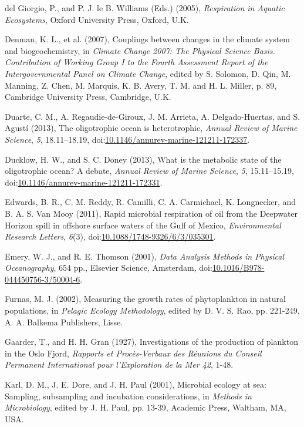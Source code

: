 \begin{singlespace}
{{del Giorgio, P., and P. J. le B. Williams (Eds.) (2005), \emph{Respiration in Aquatic Ecosystems}, Oxford University Press, Oxford, U.K.

Denman, K. L., et al. (2007), Couplings between changes in the climate system and biogeochemistry, in \emph{Climate Change 2007: The Physical Science Basis. Contribution of Working Group I to the Fourth Assessment Report of the Intergovernmental Panel on Climate Change}, edited by S. Solomon, D. Qin, M. Manning, Z. Chen, M. Marquis, K. B. Avery, T. M. and H. L. Miller, p. 89, Cambridge University Press, Cambridge, U.K.

Duarte, C. M., A. Regaudie-de-Giroux, J. M. Arrieta, A. Delgado-Huertas, and S. Agust\'{i} (2013), The oligotrophic ocean is heterotrophic, \emph{Annual Review of Marine Science}, \emph{5}, 18.11--18.19, doi:\href{http://dx.doi.org/10.1146/annurev-marine-121211-172337}{10.1146/annurev-marine-121211-172337}.

Ducklow, H. W., and S. C. Doney (2013), What is the metabolic state of the oligotrophic ocean? A debate, \emph{Annual Review of Marine Science}, \emph{5}, 15.11--15.19, doi:\href{http://dx.doi.org/10.1146/annurev-marine-121211-172331}{10.1146/annurev-marine-121211-172331}.

Edwards, B. R., C. M. Reddy, R. Camilli, C. A. Carmichael, K. Longnecker, and B. A. S. Van Mooy (2011), Rapid microbial respiration of oil from the Deepwater Horizon spill in offshore surface waters of the Gulf of Mexico, \emph{Environmental Research Letters}, \emph{6}(3), doi:\href{http://dx.doi.org/10.1088/1748-9326/6/3/035301}{10.1088/1748-9326/6/3/035301}.

Emery, W. J., and R. E. Thomson (2001), \emph{Data Analysis Methods in Physical Oceanography}, 654 pp., Elsevier Science, Amsterdam, doi:\href{http://dx.doi.org/10.1016/B978-044450756-3/50004-6}{10.1016/B978-044450756-3/50004-6}.

Furnas, M. J. (2002), Measuring the growth rates of phytoplankton in natural populations, in \emph{Pelagic Ecology Methodology}, edited by D. V. S. Rao, pp. 221-249, A. A. Balkema Publishers, Lisse.

Gaarder, T., and H. H. Gran (1927), Investigations of the production of plankton in the Oslo Fjord, \emph{Rapports et Proc\`{e}s-Verbaux des R\'{e}unions du Conseil Permanent International pour l'Exploration de la Mer 42}, 1-48.

Karl, D. M., J. E. Dore, and J. H. Paul (2001), Microbial ecology at sea: Sampling, subsampling and incubation considerations, in \emph{Methods in Microbiology}, edited by J. H. Paul, pp. 13-39, Academic Press, Waltham, MA, USA.

}}
\end{singlespace}
